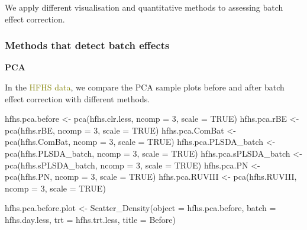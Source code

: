 \documentclass[
]{book}
\newenvironment{Shaded}{\begin{snugshade}}{\end{snugshade}}
\newcommand{\AttributeTok}[1]{\textcolor[rgb]{0.77,0.63,0.00}{#1}}
\newcommand{\ConstantTok}[1]{\textcolor[rgb]{0.00,0.00,0.00}{#1}}
\newcommand{\DecValTok}[1]{\textcolor[rgb]{0.00,0.00,0.81}{#1}}
\newcommand{\FunctionTok}[1]{\textcolor[rgb]{0.00,0.00,0.00}{#1}}
\newcommand{\NormalTok}[1]{#1}
\newcommand{\OtherTok}[1]{\textcolor[rgb]{0.56,0.35,0.01}{#1}}
\newcommand{\StringTok}[1]{\textcolor[rgb]{0.31,0.60,0.02}{#1}}
\begin{document}
We apply different visualisation and quantitative methods to assessing batch effect correction.

\hypertarget{methods-that-detect-batch-effects-2}{%
\subsubsection{Methods that detect batch effects}\label{methods-that-detect-batch-effects-2}}

\textbf{PCA}

In the \textcolor{olive}{HFHS data}, we compare the PCA sample plots before and after batch effect correction with different methods.

\begin{Shaded}
\begin{Highlighting}[]
\NormalTok{hfhs.pca.before }\OtherTok{\textless{}{-}} \FunctionTok{pca}\NormalTok{(hfhs.clr.less, }\AttributeTok{ncomp =} \DecValTok{3}\NormalTok{, }
                       \AttributeTok{scale =} \ConstantTok{TRUE}\NormalTok{)}
\NormalTok{hfhs.pca.rBE }\OtherTok{\textless{}{-}} \FunctionTok{pca}\NormalTok{(hfhs.rBE, }\AttributeTok{ncomp =} \DecValTok{3}\NormalTok{, }
                    \AttributeTok{scale =} \ConstantTok{TRUE}\NormalTok{)}
\NormalTok{hfhs.pca.ComBat }\OtherTok{\textless{}{-}} \FunctionTok{pca}\NormalTok{(hfhs.ComBat, }\AttributeTok{ncomp =} \DecValTok{3}\NormalTok{, }
                       \AttributeTok{scale =} \ConstantTok{TRUE}\NormalTok{)}
\NormalTok{hfhs.pca.PLSDA\_batch }\OtherTok{\textless{}{-}} \FunctionTok{pca}\NormalTok{(hfhs.PLSDA\_batch, }\AttributeTok{ncomp =} \DecValTok{3}\NormalTok{, }
                            \AttributeTok{scale =} \ConstantTok{TRUE}\NormalTok{)}
\NormalTok{hfhs.pca.sPLSDA\_batch }\OtherTok{\textless{}{-}} \FunctionTok{pca}\NormalTok{(hfhs.sPLSDA\_batch, }\AttributeTok{ncomp =} \DecValTok{3}\NormalTok{, }
                             \AttributeTok{scale =} \ConstantTok{TRUE}\NormalTok{)}
\NormalTok{hfhs.pca.PN }\OtherTok{\textless{}{-}} \FunctionTok{pca}\NormalTok{(hfhs.PN, }\AttributeTok{ncomp =} \DecValTok{3}\NormalTok{, }
                   \AttributeTok{scale =} \ConstantTok{TRUE}\NormalTok{)}
\NormalTok{hfhs.pca.RUVIII }\OtherTok{\textless{}{-}} \FunctionTok{pca}\NormalTok{(hfhs.RUVIII, }\AttributeTok{ncomp =} \DecValTok{3}\NormalTok{, }
                       \AttributeTok{scale =} \ConstantTok{TRUE}\NormalTok{)}
\end{Highlighting}
\end{Shaded}

\begin{Shaded}
\begin{Highlighting}[]
\NormalTok{hfhs.pca.before.plot }\OtherTok{\textless{}{-}} 
  \FunctionTok{Scatter\_Density}\NormalTok{(}\AttributeTok{object =}\NormalTok{ hfhs.pca.before, }
                  \AttributeTok{batch =}\NormalTok{ hfhs.day.less, }
                  \AttributeTok{trt =}\NormalTok{ hfhs.trt.less, }
                  \AttributeTok{title =} \StringTok{\textquotesingle{}Before\textquotesingle{}}\NormalTok{)}
\end{Highlighting}
\end{Shaded}
\end{document}
